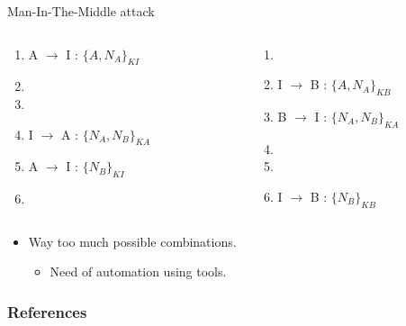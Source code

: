 \documentclass{beamer}
\begin{document}
\begin{frame}
    \begin{exampleblock}{Man-In-The-Middle attack}
        \vspace{-.8em}
        \begin{columns}
            \begin{column}{.45\textwidth}
                \begin{enumerate}
                    \item A $\rightarrow$ I : $\{A,N_{A}\}_{KI}$
                    \item[]
                    \item[]
                          \setcounter{enumi}{1}
                    \item I $\rightarrow$ A : $\{N_{A},N_{B}\}_{KA}$
                    \item A $\rightarrow$ I : $\{N_{B}\}_{KI}$
                    \item[]
                \end{enumerate}
            \end{column}
            ~
            \begin{column}{.45\textwidth}
                \begin{enumerate}
                    \item[]
                          \setcounter{enumi}{0}
                    \item I $\rightarrow$ B : $\{A,N_{A}\}_{KB}$
                    \item B $\rightarrow$ I : $\{N_{A},N_{B}\}_{KA}$
                    \item[]
                    \item[]
                          \setcounter{enumi}{2}
                    \item I $\rightarrow$ B : $\{N_{B}\}_{KB}$
                \end{enumerate}
            \end{column}
        \end{columns}
    \end{exampleblock}
    \vfill
    \begin{itemize}
        \item Way too much possible combinations.%
        \begin{itemize}
            \item Need of automation using tools.
        \end{itemize}
    \end{itemize}
\end{frame}

\begin{frame}[allowframebreaks]
    \frametitle{References}
    
    
    
\end{frame}
\end{document}
